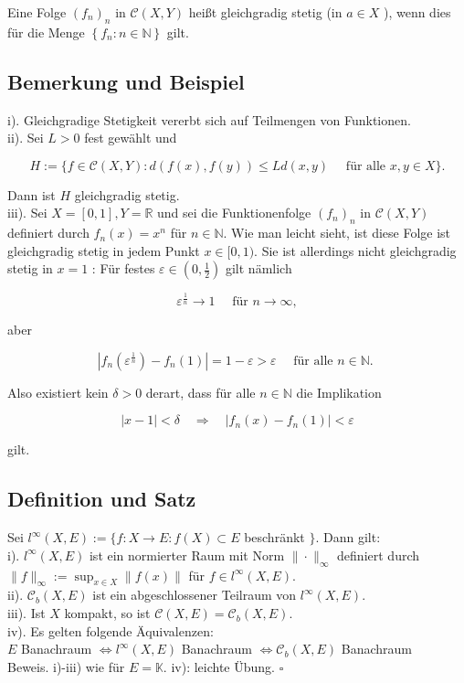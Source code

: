 \documentclass[10pt, letterpaper]{article}
\begin{document}
Eine Folge $\left(f_{n}\right)_{n}$ in $\mathcal{C}(X, Y)$ heißt gleichgradig stetig (in $a \in X$ ), wenn dies für die Menge $\left\{f_{n}: n \in \mathbb{N}\right\}$ gilt.

\subsection*{Bemerkung und Beispiel}
i). Gleichgradige Stetigkeit vererbt sich auf Teilmengen von Funktionen.\\
ii). Sei $L>0$ fest gewählt und

$$
H:=\{f \in \mathcal{C}(X, Y): d(f(x), f(y)) \leq L d(x, y) \quad \text { für alle } x, y \in X\} .
$$

Dann ist $H$ gleichgradig stetig.\\
iii). Sei $X=[0,1], Y=\mathbb{R}$ und sei die Funktionenfolge $\left(f_{n}\right)_{n}$ in $\mathcal{C}(X, Y)$ definiert durch $f_{n}(x)=x^{n}$ für $n \in \mathbb{N}$. Wie man leicht sieht, ist diese Folge ist gleichgradig stetig in jedem Punkt $x \in[0,1)$. Sie ist allerdings nicht gleichgradig stetig in $x=1$ : Für festes $\varepsilon \in\left(0, \frac{1}{2}\right)$ gilt nämlich

$$
\varepsilon^{\frac{1}{n}} \rightarrow 1 \quad \text { für } n \rightarrow \infty,
$$

aber

$$
\left|f_{n}\left(\varepsilon^{\frac{1}{n}}\right)-f_{n}(1)\right|=1-\varepsilon>\varepsilon \quad \text { für alle } n \in \mathbb{N} \text {. }
$$

Also existiert kein $\delta>0$ derart, dass für alle $n \in \mathbb{N}$ die Implikation

$$
|x-1|<\delta \quad \Longrightarrow \quad\left|f_{n}(x)-f_{n}(1)\right|<\varepsilon
$$

gilt.

\subsection*{Definition und Satz}
Sei $l^{\infty}(X, E):=\{f: X \rightarrow E: f(X) \subset E$ beschränkt $\}$. Dann gilt:\\
i). $l^{\infty}(X, E)$ ist ein normierter Raum mit Norm $\|\cdot\|_{\infty}$ definiert durch $\|f\|_{\infty}:= \sup _{x \in X}\|f(x)\|$ für $f \in l^{\infty}(X, E)$.\\
ii). $\mathcal{C}_{b}(X, E)$ ist ein abgeschlossener Teilraum von $l^{\infty}(X, E)$.\\
iii). Ist $X$ kompakt, so ist $\mathcal{C}(X, E)=\mathcal{C}_{b}(X, E)$.\\
iv). Es gelten folgende Äquivalenzen:\\
$E$ Banachraum $\Longleftrightarrow l^{\infty}(X, E)$ Banachraum $\Longleftrightarrow \mathcal{C}_{b}(X, E)$ Banachraum\\
Beweis. i)-iii) wie für $E=\mathbb{K}$. iv): leichte Übung. \(\square\)
\end{document}
